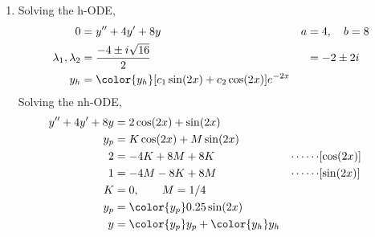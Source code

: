 \begin{enumerate}
    \item Solving the h-ODE,
          \begin{align}
              0                        & = y'' + 4y' + 8y                                     & a & = 4, \quad b = 8 \\
              \lambda_{1}, \lambda_{2} & = \frac{-4 \pm i\sqrt{16}}{2}                        &   & = -2 \pm 2i      \\
              y_{h}                    & = \color{y_h} [c_{1}\sin(2x) + c_{2}\cos(2x)]e^{-2x}
          \end{align}
          Solving the nh-ODE,
          \begin{align}
              y'' + 4y' + 8y & = 2\cos(2x) + \sin(2x)                                                  \\
              y_{p}          & = K \cos(2x) + M \sin(2x)                                               \\
              2              & = -4K + 8M + 8K                             & \cdots\cdots & [\cos(2x)] \\
              1              & = -4M - 8K + 8M                             & \cdots\cdots & [\sin(2x)] \\
              K              & = 0, \qquad M = 1/4                                                     \\
              y_{p}          & = \color{y_p} 0.25 \sin(2x)                                             \\
              y              & = {\color{y_p} y_{p}} + {\color{y_h} y_{h}}
          \end{align}


\end{enumerate}
